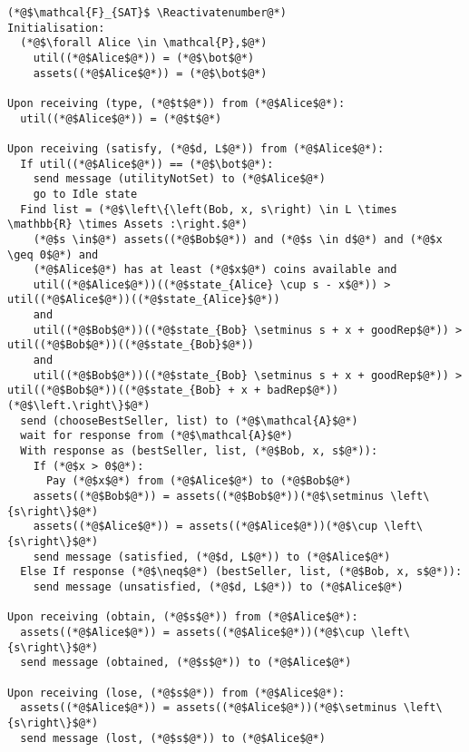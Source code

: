 \Suppressnumber
\begin{lstlisting}[label=satfunc, style=numbers]
(*@$\mathcal{F}_{SAT}$ \Reactivatenumber@*)
Initialisation:
  (*@$\forall Alice \in \mathcal{P},$@*)
    util((*@$Alice$@*)) = (*@$\bot$@*)
    assets((*@$Alice$@*)) = (*@$\bot$@*)

Upon receiving (type, (*@$t$@*)) from (*@$Alice$@*):
  util((*@$Alice$@*)) = (*@$t$@*)

Upon receiving (satisfy, (*@$d, L$@*)) from (*@$Alice$@*):
  If util((*@$Alice$@*)) == (*@$\bot$@*):
    send message (utilityNotSet) to (*@$Alice$@*)
    go to Idle state
  Find list = (*@$\left\{\left(Bob, x, s\right) \in L \times \mathbb{R} \times Assets :\right.$@*)
    (*@$s \in$@*) assets((*@$Bob$@*)) and (*@$s \in d$@*) and (*@$x \geq 0$@*) and
    (*@$Alice$@*) has at least (*@$x$@*) coins available and
    util((*@$Alice$@*))((*@$state_{Alice} \cup s - x$@*)) > util((*@$Alice$@*))((*@$state_{Alice}$@*))
    and
    util((*@$Bob$@*))((*@$state_{Bob} \setminus s + x + goodRep$@*)) > util((*@$Bob$@*))((*@$state_{Bob}$@*))
    and
    util((*@$Bob$@*))((*@$state_{Bob} \setminus s + x + goodRep$@*)) > util((*@$Bob$@*))((*@$state_{Bob} + x + badRep$@*))(*@$\left.\right\}$@*)
  send (chooseBestSeller, list) to (*@$\mathcal{A}$@*)
  wait for response from (*@$\mathcal{A}$@*)
  With response as (bestSeller, list, (*@$Bob, x, s$@*)):
    If (*@$x > 0$@*):
      Pay (*@$x$@*) from (*@$Alice$@*) to (*@$Bob$@*)
    assets((*@$Bob$@*)) = assets((*@$Bob$@*))(*@$\setminus \left\{s\right\}$@*)
    assets((*@$Alice$@*)) = assets((*@$Alice$@*))(*@$\cup \left\{s\right\}$@*)
    send message (satisfied, (*@$d, L$@*)) to (*@$Alice$@*)
  Else If response (*@$\neq$@*) (bestSeller, list, (*@$Bob, x, s$@*)):
    send message (unsatisfied, (*@$d, L$@*)) to (*@$Alice$@*)

Upon receiving (obtain, (*@$s$@*)) from (*@$Alice$@*):
  assets((*@$Alice$@*)) = assets((*@$Alice$@*))(*@$\cup \left\{s\right\}$@*)
  send message (obtained, (*@$s$@*)) to (*@$Alice$@*)

Upon receiving (lose, (*@$s$@*)) from (*@$Alice$@*):
  assets((*@$Alice$@*)) = assets((*@$Alice$@*))(*@$\setminus \left\{s\right\}$@*)
  send message (lost, (*@$s$@*)) to (*@$Alice$@*)
\end{lstlisting}
